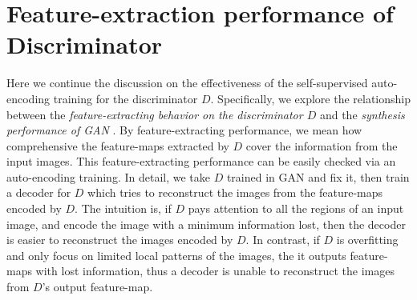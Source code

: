 \documentclass{article} \usepackage{iclr2021_conference,times}
\begin{document}
\section{Feature-extraction performance of Discriminator}
\begin{table}[h]
\caption{LPIPS on $D$'s feature-extracting performance}
\label{table:d-decoder}
\begin{center}
\end{center}
\end{table}

Here we continue the discussion on the effectiveness of the self-supervised auto-encoding training for the discriminator $D$. Specifically, we explore the relationship between the \textit{ feature-extracting behavior on the discriminator $D$ } and the \textit{ synthesis performance of GAN }. By feature-extracting performance, we mean how comprehensive the feature-maps extracted by $D$ cover the information from the input images. This feature-extracting performance can be easily checked via an auto-encoding training. In detail, we take $D$ trained in GAN and fix it, then train a decoder for $D$ which tries to reconstruct the images from the feature-maps encoded by $D$. The intuition is, if $D$ pays attention to all the regions of an input image, and encode the image with a minimum information lost, then the decoder is easier to reconstruct the images encoded by $D$. In contrast, if $D$ is overfitting and only focus on limited local patterns of the images, the it outputs feature-maps with lost information, thus a decoder is unable to reconstruct the images from $D$'s output feature-map.  
\end{document}

